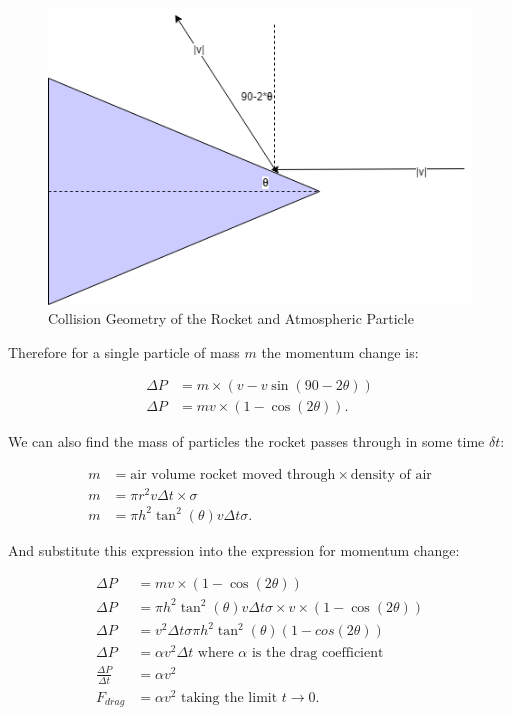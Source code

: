 \documentclass[]{article}
\begin{document}
\begin{figure}[h]
	\begin{center}
		\caption{Collision Geometry of the Rocket and Atmospheric Particle}
		\label{collision}
		\includegraphics[scale=0.5]{collision.png}
	\end{center}
\end{figure}


Therefore for a single particle of mass $m$ the momentum change is:
\begin{center}
	\begin{align*}
	\Delta P &= m\times (v-v\sin(90-2\theta)) \\
	\Delta P &= mv\times(1-\cos(2\theta)) .
	\end{align*}
\end{center}

We can also find the mass of particles the rocket passes through in some time $\delta t$:

\begin{center}
	\begin{align*}
	m &= \text{air volume rocket moved through}\times \text{density of air} \\
	m &= \pi r^2 v \Delta t \times \sigma \\
	m &= \pi h^2 \tan^2(\theta) v \Delta t \sigma .
	\end{align*}
\end{center}

And substitute this expression into the expression for momentum change:

\begin{center}
	\begin{align*}
	\Delta P &= mv\times(1-\cos(2\theta)) \\
	\Delta P &= \pi h^2 \tan^2(\theta) v \Delta t \sigma \times v\times(1-\cos(2\theta)) \\
	\Delta P &= v^2 \Delta t \sigma \pi h^2 \tan^2(\theta) (1-cos(2\theta)) \\
	\Delta P &= \alpha v^2 \Delta t \text{  where $\alpha$ is the drag coefficient} \\
	\frac{\Delta P}{\Delta t} &= \alpha v^2 \\
	F_{drag} &= \alpha v^2 \text{  taking the limit $t\rightarrow 0$} .
	\end{align*}
\end{center}
\end{document}
